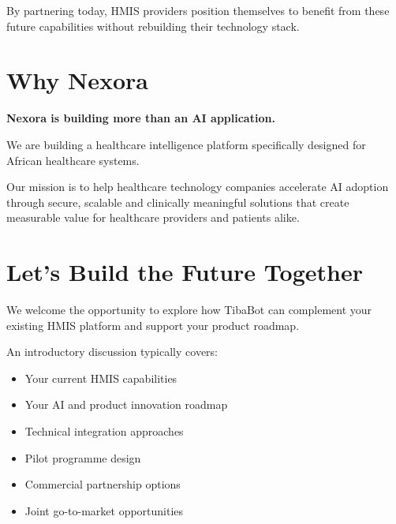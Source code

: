 By partnering today, HMIS providers position themselves to benefit from these future capabilities without rebuilding their technology stack.


\section{Why Nexora}

\begin{infobox}

\textbf{Nexora is building more than an AI application.}

\vspace{4mm}

We are building a healthcare intelligence platform specifically designed for African healthcare systems.

Our mission is to help healthcare technology companies accelerate AI adoption through secure, scalable and clinically meaningful solutions that create measurable value for healthcare providers and patients alike.

\end{infobox}


\section{Let's Build the Future Together}

We welcome the opportunity to explore how TibaBot can complement your existing HMIS platform and support your product roadmap.

An introductory discussion typically covers:

\begin{itemize}

\item Your current HMIS capabilities

\item Your AI and product innovation roadmap

\item Technical integration approaches

\item Pilot programme design

\item Commercial partnership options

\item Joint go-to-market opportunities

\end{itemize}

